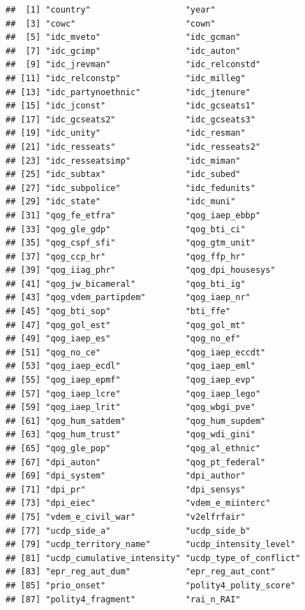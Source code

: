 \documentclass[
]{article}
\begin{document}
\begin{verbatim}
##  [1] "country"                   "year"                     
##  [3] "cowc"                      "cown"                     
##  [5] "idc_mveto"                 "idc_gcman"                
##  [7] "idc_gcimp"                 "idc_auton"                
##  [9] "idc_jrevman"               "idc_relconstd"            
## [11] "idc_relconstp"             "idc_milleg"               
## [13] "idc_partynoethnic"         "idc_jtenure"              
## [15] "idc_jconst"                "idc_gcseats1"             
## [17] "idc_gcseats2"              "idc_gcseats3"             
## [19] "idc_unity"                 "idc_resman"               
## [21] "idc_resseats"              "idc_resseats2"            
## [23] "idc_resseatsimp"           "idc_miman"                
## [25] "idc_subtax"                "idc_subed"                
## [27] "idc_subpolice"             "idc_fedunits"             
## [29] "idc_state"                 "idc_muni"                 
## [31] "qog_fe_etfra"              "qog_iaep_ebbp"            
## [33] "qog_gle_gdp"               "qog_bti_ci"               
## [35] "qog_cspf_sfi"              "qog_gtm_unit"             
## [37] "qog_ccp_hr"                "qog_ffp_hr"               
## [39] "qog_iiag_phr"              "qog_dpi_housesys"         
## [41] "qog_jw_bicameral"          "qog_bti_ig"               
## [43] "qog_vdem_partipdem"        "qog_iaep_nr"              
## [45] "qog_bti_sop"               "bti_ffe"                  
## [47] "qog_gol_est"               "qog_gol_mt"               
## [49] "qog_iaep_es"               "qog_no_ef"                
## [51] "qog_no_ce"                 "qog_iaep_eccdt"           
## [53] "qog_iaep_ecdl"             "qog_iaep_eml"             
## [55] "qog_iaep_epmf"             "qog_iaep_evp"             
## [57] "qog_iaep_lcre"             "qog_iaep_lego"            
## [59] "qog_iaep_lrit"             "qog_wbgi_pve"             
## [61] "qog_hum_satdem"            "qog_hum_supdem"           
## [63] "qog_hum_trust"             "qog_wdi_gini"             
## [65] "qog_gle_pop"               "qog_al_ethnic"            
## [67] "dpi_auton"                 "qog_pt_federal"           
## [69] "dpi_system"                "dpi_author"               
## [71] "dpi_pr"                    "dpi_sensys"               
## [73] "dpi_eiec"                  "vdem_e_miinterc"          
## [75] "vdem_e_civil_war"          "v2elfrfair"               
## [77] "ucdp_side_a"               "ucdp_side_b"              
## [79] "ucdp_territory_name"       "ucdp_intensity_level"     
## [81] "ucdp_cumulative_intensity" "ucdp_type_of_conflict"    
## [83] "epr_reg_aut_dum"           "epr_reg_aut_cont"         
## [85] "prio_onset"                "polity4_polity_score"     
## [87] "polity4_fragment"          "rai_n_RAI"
\end{verbatim}
\end{document}
